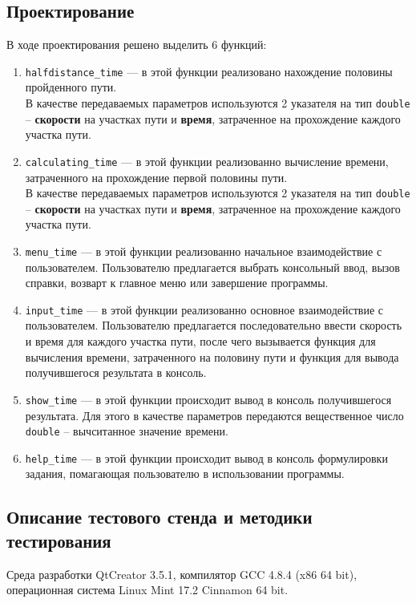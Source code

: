 \documentclass[12pt,a4paper]{report}
\begin{document}
\subsection{Проектирование}
\hspace{\parindent}В ходе проектирования решено выделить 6 функций:
\begin{enumerate}
	\item \texttt{halfdistance\_time} ---
	в этой функции реализовано нахождение половины пройденного пути.
	\\В качестве передаваемых параметров используются 2 указателя на тип \texttt{double} -- \textbf{скорости}  на участках пути и \textbf{время}, затраченное на прохождение каждого участка пути.
		 
	\item \texttt{calculating\_time} ---
	в этой функции реализованно вычисление времени, затраченного на прохождение первой половины пути. 
	\\В качестве передаваемых параметров используются 2 указателя на тип \texttt{double} -- \textbf{скорости}  на участках пути и \textbf{время}, затраченное на прохождение каждого участка пути.	
		 
	\item \texttt{menu\_time} ---
	в этой функции реализованно начальное взаимодействие с пользователем. Пользователю предлагается выбрать консольный ввод, вызов справки, возварт к главное меню или завершение программы.
	
	\item \texttt{input\_time} ---
	в этой функции реализованно основное взаимодействие с пользователем. Пользователю предлагается последовательно ввести скорость и время для каждого участка пути, после чего вызывается функция для вычисления времени, затраченного на половину пути и функция для вывода получившегося результата в консоль.
	
	\item \texttt{show\_time} ---
	в этой функции происходит вывод в консоль получившегося результата. Для этого в качестве параметров передаются вещественное число \texttt{double} -- вычситанное значение времени.

	\item \texttt{help\_time} ---
	в этой функции происходит вывод в консоль формулировки задания, помагающая пользователю в использовании программы.
\end{enumerate}

\subsection{Описание тестового стенда и методики тестирования}
\hspace{\parindent}Среда разработки QtCreator 3.5.1, компилятор GCC 4.8.4 (x86 64 bit), операционная система Linux Mint 17.2 Cinnamon 64 bit.
\end{document}
